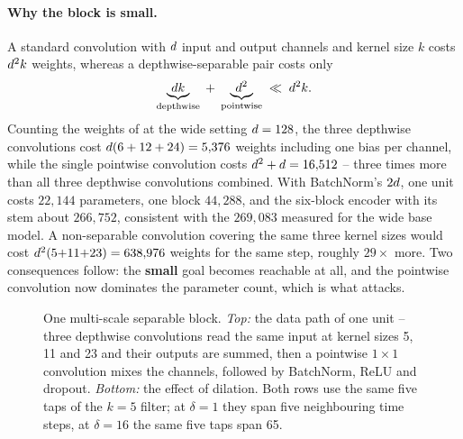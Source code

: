 \paragraph{Why the block is small.}
A standard convolution with $d$ input and output channels and kernel size $k$ costs
$d^2 k$ weights, whereas a depthwise-separable pair costs only
\begin{equation}
  \underbrace{d k}_{\text{depthwise}} \;+\; \underbrace{d^2}_{\text{pointwise}}
  \;\ll\; d^2 k .
  \label{eq:sep_cost}
\end{equation}
Counting the weights of  at the wide setting $d = 128$, the three depthwise
convolutions cost $d(6 + 12 + 24) = 5{,}376$ weights including one bias per channel, while the
single pointwise convolution costs $d^2 + d = 16{,}512$ -- three times more than all
three depthwise convolutions combined. With BatchNorm's $2d$, one unit costs $22{,}144$
parameters, one block $44{,}288$, and the six-block encoder with its stem about $266{,}752$,
consistent with the $269{,}083$ measured for the wide base model. A non-separable convolution
covering the same three kernel sizes would cost $d^2(5{+}11{+}23) = 638{,}976$ weights for the
same step, roughly $29\times$ more. Two consequences follow: the \textbf{small} goal becomes
reachable at all, and
the pointwise convolution now dominates the parameter count, which is what 
attacks.

\ifshowblockfig
\begin{figure}[t]
  \centering
  
  \caption{One multi-scale separable block. \emph{Top:} the data path of one unit -- three depthwise
  convolutions read the same input at kernel sizes 5, 11 and 23 and their outputs are summed, then a
  pointwise $1\times1$ convolution mixes the channels, followed by BatchNorm, ReLU and dropout.
  \emph{Bottom:} the effect of dilation. Both rows use the same five taps of the $k=5$ filter; at
  $\delta=1$ they span five neighbouring time steps, at $\delta=16$ the same five taps span 65.}
  \label{fig:arch_block}
\end{figure}
\fi

